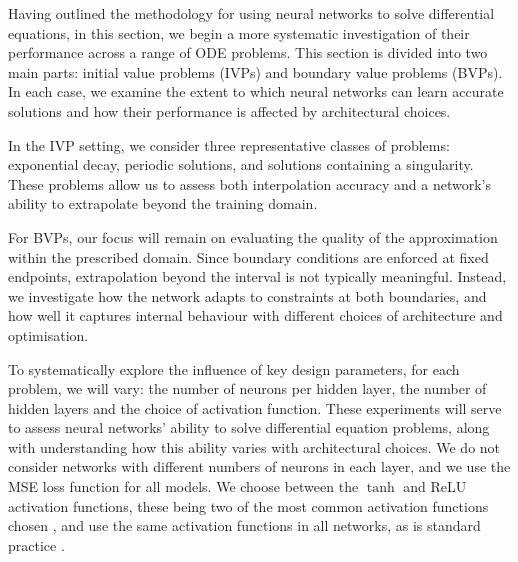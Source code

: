 Having outlined the methodology for using neural networks to solve differential equations, in this 
section, we begin a more systematic investigation of their performance across a range of ODE problems.
This section is divided into two main parts: initial value problems (IVPs) and boundary value problems
(BVPs). In each case, we examine the extent to which neural networks can learn accurate solutions 
and how their performance is affected by architectural choices.

In the IVP setting, we consider three representative classes of problems: exponential decay,
periodic solutions, and solutions containing a singularity. These problems allow us to assess 
both interpolation accuracy and a network's ability to extrapolate beyond the training domain.

For BVPs, our focus will remain on evaluating the quality of the approximation within the 
prescribed domain. Since boundary conditions are enforced at fixed endpoints, extrapolation 
beyond the interval is not typically meaningful. Instead, we investigate how the network adapts
to constraints at both boundaries, and how well it captures internal behaviour with different
choices of architecture and optimisation.

To systematically explore the influence of key design parameters, for each problem, we will vary: 
the number of neurons per hidden layer, the number of hidden layers and the choice of activation 
function. These experiments will serve to assess neural networks' ability to solve differential 
equation problems, along with understanding how this ability varies with architectural choices. 
We do not consider networks with different numbers of neurons in each layer, and we use the MSE
loss function for all models. We choose between the $\tanh$ and ReLU activation functions,
these being two of the most common activation functions chosen \cite{goodfellow2016deep}, 
and use the same activation functions in all networks, as is standard practice \cite{goodfellow2016deep}.

